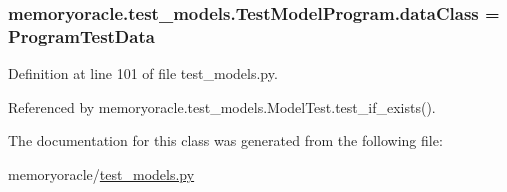 \subsubsection[{data\+Class}]{\setlength{\rightskip}{0pt plus 5cm}memoryoracle.\+test\+\_\+models.\+Test\+Model\+Program.\+data\+Class = {\bf Program\+Test\+Data}\hspace{0.3cm}{\ttfamily [static]}}\label{classmemoryoracle_1_1test__models_1_1TestModelProgram_a0eeedc5fe11dbeb0ba65fcbda030b10d}


Definition at line 101 of file test\+\_\+models.\+py.



Referenced by memoryoracle.\+test\+\_\+models.\+Model\+Test.\+test\+\_\+if\+\_\+exists().



The documentation for this class was generated from the following file\+:\begin{DoxyCompactItemize}
\item 
memoryoracle/\hyperlink{test__models_8py}{test\+\_\+models.\+py}\end{DoxyCompactItemize}
